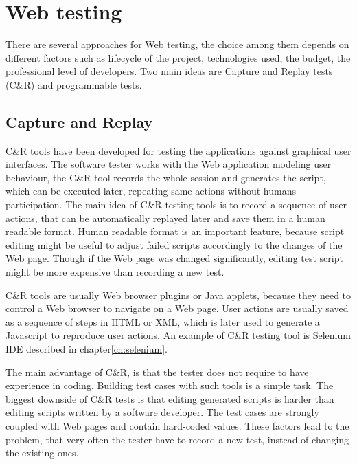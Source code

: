 	\chapter{Web testing}
	\label{ch:Webtesting}

		There are several approaches for Web testing, the choice among them depends on
		different factors such as lifecycle of the project, technologies used, the
		budget, the professional level of developers. Two main ideas are Capture and
		Replay tests (C\&R) and programmable tests.
		
		\section{Capture and Replay}
		\label{sec:captureReplay}
			C\&R tools have been developed for testing the applications against graphical user interfaces. 
			The software tester works with the Web application modeling user behaviour,
			the C\&R tool records the whole session and generates the
			script, which can be executed later,	repeating same actions without humans participation.
			  The main idea of C\&R
			testing tools is to record a sequence of user actions, that can be
			automatically replayed later and save them in a human readable format. Human
			readable format is an important feature, because script editing might
			 be useful to adjust failed scripts accordingly	to the changes of the Web page.
			 Though if the Web page was changed	significantly, editing test script might be more expensive than recording a
			new test\cite{CaptureReplay7}. 
			
C\&R tools are usually Web browser plugins or Java applets, because they
need to control a Web browser to navigate on a Web page. User actions are
usually saved as a sequence of steps in HTML or XML, which is later used to
generate a Javascript to reproduce user actions. An example of C\&R testing
tool is Selenium IDE described in chapter\ref{ch:selenium}.

The main advantage of C\&R, is that the tester does not
require to have experience in coding. Building test cases with such tools
is a simple task.
The biggest downside of C\&R tests is that editing generated
scripts is harder than editing scripts written by a software
developer\cite{CaptureReplay7}. The test cases are strongly coupled with Web pages and contain hard-coded values. These factors lead to the
problem, that very often the tester have to record a new test, instead of
changing the existing ones.

